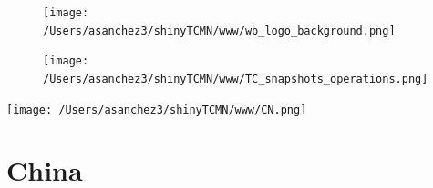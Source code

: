 \documentclass{article}\usepackage[]{graphicx}\usepackage[]{color}
\begin{document}
\newpage

\begin{figure}
  \vspace{-3ex} %
  \hspace{-7ex} %
  \texttt{[image: /Users/asanchez3/shinyTCMN/www/wb\_logo\_background.png]}
\end{figure}
\begin{figure}
  \begin{minipage}[t]{0.99\textwidth} %
      \vspace{-30ex}
      \hspace{-2ex}
      \raggedright{\texttt{[image: /Users/asanchez3/shinyTCMN/www/TC\_snapshots\_operations.png]}}
  \end{minipage}
\end{figure}

\begin{minipage}[t]{0.99\textwidth} %
  \vspace{-1.5cm}
  \begin{minipage}[c]{0.36\textwidth} 
    \begin{minipage}[c]{0.28\textwidth} %
      \texttt{[image: /Users/asanchez3/shinyTCMN/www/CN.png]}
    \end{minipage}
    \begin{minipage}[c]{0.70\textwidth} %
      \section*{\color{blue!40!black}China}
    \end{minipage}
  \end{minipage}
  \begin{minipage}[c]{0.63\textwidth}
    \begin{flushleft}  
    \end{flushleft} 
  \end{minipage}  
\end{minipage} %
\end{document}
